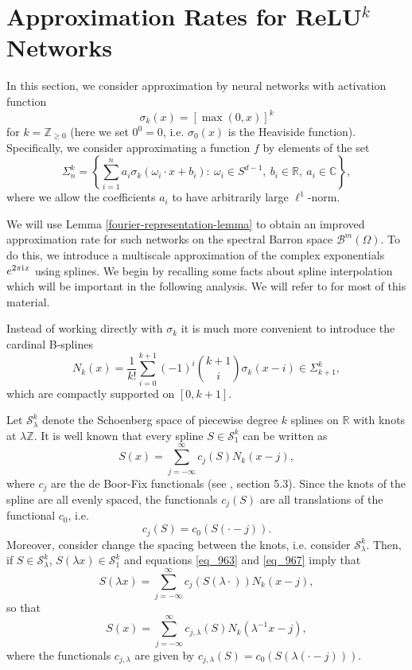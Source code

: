 \section{Approximation Rates for ReLU$^k$ Networks}\label{relu-result-section}
In this section, we consider approximation by neural networks with activation function $$\sigma_k(x) = [\max(0,x)]^k$$ for $k=\mathbb{Z}_{\geq 0}$ (here we set $0^0 = 0$, i.e. $\sigma_0(x)$ is the Heaviside function). Specifically, we consider approximating a function $f$ by elements of the set
\begin{equation}
 \Sigma^k_{n} = \left\{\sum_{i=1}^n a_i\sigma_k(\omega_i\cdot x + b_i):~\omega_i\in S^{d-1},~b_i\in \mathbb{R},~a_i\in\mathbb{C}\right\},
\end{equation}
where we allow the coefficients $a_i$ to have arbitrarily large $\ell^1$-norm.

We will use Lemma \ref{fourier-representation-lemma} to obtain an improved approximation rate for such networks on the spectral Barron space $\mathcal{B}^m(\Omega)$. To do this, we introduce a multiscale approximation of the complex exponentials $e^{2\pi {\mathrm{i}\mkern1mu} x}$ using splines. We begin by recalling some facts about spline interpolation which will be important in the following analysis. We will refer to \cite{devore1993constructive} for most of this material.

Instead of working directly with $\sigma_k$ it is much more convenient to introduce the cardinal B-splines
\begin{equation}\label{card-b-splines-def}
 N_k(x) = \frac{1}{k!}\sum_{i=0}^{k+1}(-1)^i\binom{k+1}{i}\sigma_k(x-i) \in \Sigma_{k+1}^k,
\end{equation}
which are compactly supported on $[0,k+1]$. 

Let $\mathcal{S}^k_\lambda$ denote the Schoenberg space of piecewise degree $k$ splines on $\mathbb{R}$ with knots at $\lambda \mathbb{Z}$. It is well known that every spline $S\in\mathcal{S}^k_1$ can be written as
\begin{equation}\label{eq_963}
 S(x) = \sum_{j=-\infty}^\infty c_j(S)N_k(x-j),
\end{equation}
where $c_j$ are the de Boor-Fix functionals (see \cite{devore1993constructive}, section 5.3). Since the knots of the spline are all evenly spaced, the functionals $c_j(S)$ are all translations of the functional $c_0$, i.e.
\begin{equation}\label{eq_967}
 c_j(S) = c_0(S(\cdot-j)).
\end{equation}
Moreover, consider change the spacing between the knots, i.e. consider $\mathcal{S}^k_\lambda$. Then, if $S\in \mathcal{S}^k_\lambda$, $S(\lambda x)\in \mathcal{S}^k_1$ and equations \eqref{eq_963} and \eqref{eq_967} imply that
\begin{equation}
 S(\lambda x) = \sum_{j=-\infty}^\infty c_j(S(\lambda\cdot))N_k(x-j),
\end{equation}
so that
\begin{equation}
 S(x) = \sum_{j=-\infty}^\infty c_{j,\lambda}(S)N_k(\lambda^{-1}x-j),
\end{equation}
where the functionals $c_{j,\lambda}$ are given by $c_{j,\lambda}(S) = c_0(S(\lambda(\cdot - j)))$.

